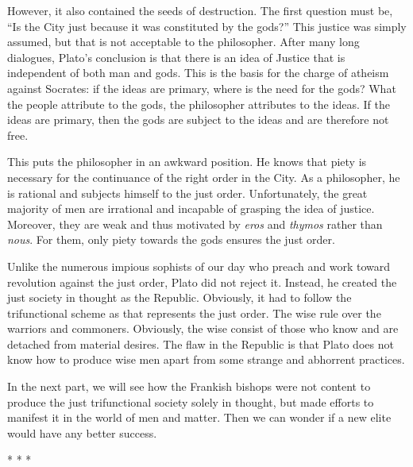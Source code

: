 However, it also contained the seeds of destruction. The first question must be, ``Is the City just because it was constituted by the gods?'' This justice was simply assumed, but that is not acceptable to the philosopher. After many long dialogues, Plato's conclusion is that there is an idea of Justice that is independent of both man and gods. This is the basis for the charge of atheism against Socrates: if the ideas are primary, where is the need for the gods? What the people attribute to the gods, the philosopher attributes to the ideas. If the ideas are primary, then the gods are subject to the ideas and are therefore not free.

This puts the philosopher in an awkward position. He knows that piety is necessary for the continuance of the right order in the City. As a philosopher, he is rational and subjects himself to the just order. Unfortunately, the great majority of men are irrational and incapable of grasping the idea of justice. Moreover, they are weak and thus motivated by \emph{eros} and \emph{thymos} rather than \emph{nous}. For them, only piety towards the gods ensures the just order.

Unlike the numerous impious sophists of our day who preach and work toward revolution against the just order, Plato did not reject it. Instead, he created the just society in thought as the Republic. Obviously, it had to follow the trifunctional scheme as that represents the just order. The wise rule over the warriors and commoners. Obviously, the wise consist of those who know and are detached from material desires. The flaw in the Republic is that Plato does not know how to produce wise men apart from some strange and abhorrent practices.

In the next part, we will see how the Frankish bishops were not content to produce the just trifunctional society solely in thought, but made efforts to manifest it in the world of men and matter. Then we can wonder if a new elite would have any better success.



\begin{center}* * *\end{center}

